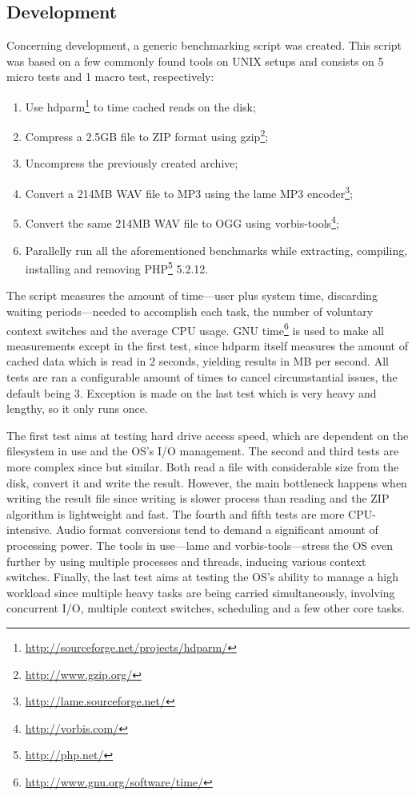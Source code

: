 \subsection{Development}
Concerning development, a generic benchmarking script was created. This script was based on a few commonly found tools on UNIX setups and consists on 5 micro tests and 1 macro test, respectively:
\begin{enumerate}
  \item Use hdparm\footnote{\url{http://sourceforge.net/projects/hdparm/}} to time cached reads on the disk;
  \item Compress a 2.5GB file to ZIP format using gzip\footnote{\url{http://www.gzip.org/}};
  \item Uncompress the previously created archive;
  \item Convert a 214MB WAV file to MP3 using the lame MP3 encoder\footnote{\url{http://lame.sourceforge.net/}};
  \item Convert the same 214MB WAV file to OGG using vorbis-tools\footnote{\url{http://vorbis.com/}};
  \item Parallelly run all the aforementioned benchmarks while extracting, compiling, installing and removing PHP\footnote{\url{http://php.net/}} 5.2.12.
\end{enumerate}
The script measures the amount of time---user plus system time, discarding waiting periods---needed to accomplish each task, the number of voluntary context switches and the average CPU usage. GNU time\footnote{\url{http://www.gnu.org/software/time/}} is used to make all measurements except in the first test, since hdparm itself measures the amount of cached data which is read in 2 seconds, yielding results in MB per second. All tests are ran a configurable amount of times to cancel circumstantial issues, the default being 3. Exception is made on the last test which is very heavy and lengthy, so it only runs once.

The first test aims at testing hard drive access speed, which are dependent on the filesystem in use and the OS's I/O management. The second and third tests are more complex since but similar. Both read a file with considerable size from the disk, convert it and write the result. However, the main bottleneck happens when writing the result file since writing is slower process than reading and the ZIP algorithm is lightweight and fast. The fourth and fifth tests are more CPU-intensive. Audio format conversions tend to demand a significant amount of processing power. The tools in use---lame and vorbis-tools---stress the OS even further by using multiple processes and threads, inducing various context switches. Finally, the last test aims at testing the OS's ability to manage a high workload since multiple heavy tasks are being carried simultaneously, involving concurrent I/O, multiple context switches, scheduling and a few other core tasks.

